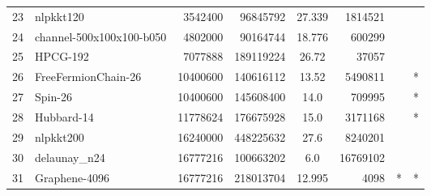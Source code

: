 \begin{tabular}{|l|l|r|r|S[round-mode=places,round-precision=2]|r|r|c|}
{23}& {nlpkkt120}	& 3542400	& 96845792	& 27.339	& 1814521	& {} &	\\
{24}& {channel-500x100x100-b050}	& 4802000	& 90164744	& 18.776	& 600299	& {} &	\\
{25}& {HPCG-192}	& 7077888	& 189119224	& 26.72	& 37057	& {} &	\\
{26}& {FreeFermionChain-26}	& 10400600	& 140616112	& 13.52	& 5490811	& {} & {*}	\\
{27}& {Spin-26}	& 10400600	& 145608400	& 14.0	& 709995	& {} &	{*}\\
{28}& {Hubbard-14}	& 11778624	& 176675928	& 15.0	& 3171168	& {} &	{*}\\
{29}& {nlpkkt200}	& 16240000	& 448225632	& 27.6	& 8240201	& {} &	\\
{30}& {delaunay\_n24}	& 16777216	& 100663202	& 6.0	& 16769102	& {} &	\\
{31}& {Graphene-4096}	& 16777216	& 218013704	& 12.995	& 4098	& {*} &	{*}\\
\bottomrule
\end{tabular}


